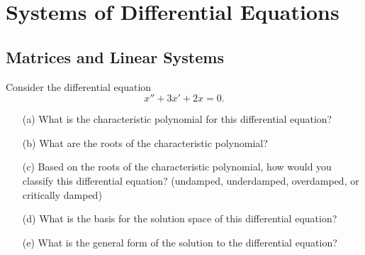\chapter{Systems of Differential Equations}

\section{Matrices and Linear Systems}


\begin{problem}
    Consider the differential equation
    \[ x'' + 3x' + 2x = 0. \]
    \begin{enumerate}
        \item[(a)] What is the characteristic polynomial for this differential equation?
        \item[(b)] What are the roots of the characteristic polynomial?
        \item[(c)] Based on the roots of the characteristic polynomial, how would you
            classify this differential equation? (undamped, underdamped, overdamped, or
            critically damped)
        \item[(d)] What is the basis for the solution space of this differential equation?
        \item[(e)] What is the general form of the solution to the differential equation?
    \end{enumerate}
\end{problem}

